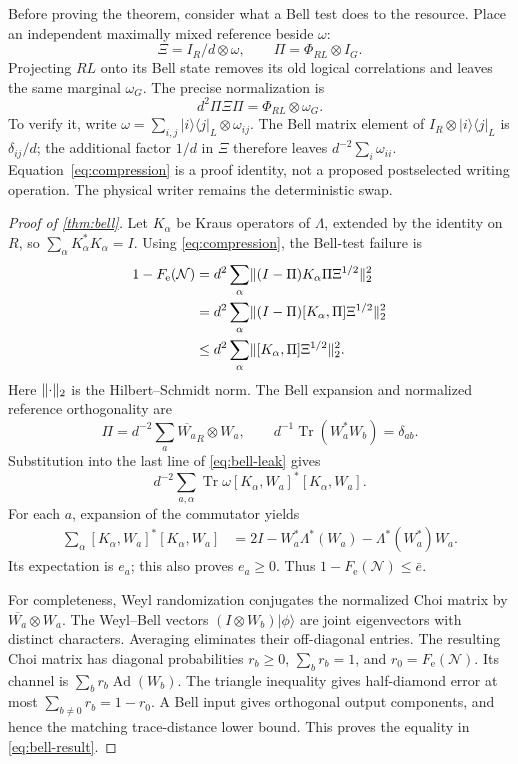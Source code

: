 \documentclass[11pt,reqno]{amsart}
\numberwithin{equation}{section}
\theoremstyle{definition}
\theoremstyle{remark}
\newcommand{\Tr}{\operatorname{Tr}}
\newcommand{\Ad}{\operatorname{Ad}}
\newcommand{\Ncal}{\mathcal N}
\newcommand{\Fe}{F_{\mathrm e}}
\DeclarePairedDelimiter{\norm}{\lVert}{\rVert}
\begin{document}
Before proving the theorem, consider what a Bell test does to the resource.
Place an independent maximally mixed reference beside \(\omega\):
\[
             \Xi=I_R/d\otimes\omega,\qquad
             \Pi=\Phi_{RL}\otimes I_G.
\]
Projecting \(RL\) onto its Bell state removes its old logical correlations
and leaves the same marginal \(\omega_G\). The precise normalization is
\begin{equation}\label{eq:compression}
                d^2\Pi\Xi\Pi=\Phi_{RL}\otimes\omega_G.
\end{equation}
To verify it, write
\(\omega=\sum_{i,j}|i\rangle\langle j|_L\otimes\omega_{ij}\).
The Bell matrix element of \(I_R\otimes|i\rangle\langle j|_L\)
is \(\delta_{ij}/d\); the additional factor \(1/d\) in \(\Xi\)
therefore leaves \(d^{-2}\sum_i\omega_{ii}\).
Equation~\eqref{eq:compression} is a proof identity, not a proposed
postselected writing operation. The physical writer remains the
deterministic swap.

\begin{proof}[Proof of \cref{thm:bell}]
Let \(K_\alpha\) be Kraus operators of \(\Lambda\), extended by the identity
on \(R\), so \(\sum_\alpha K_\alpha^*K_\alpha=I\).
Using \eqref{eq:compression}, the Bell-test failure is
\begin{align}
 1-\Fe(\Ncal)
 &=d^2\sum_\alpha
       \norm{(I-\Pi)K_\alpha\Pi\Xi^{1/2}}_2^2 \notag\\
 &=d^2\sum_\alpha
       \norm{(I-\Pi)[K_\alpha,\Pi]\Xi^{1/2}}_2^2 \notag\\
 &\le d^2\sum_\alpha\norm{[K_\alpha,\Pi]\Xi^{1/2}}_2^2 .
                                                        \label{eq:bell-leak}
\end{align}
Here \(\norm{\cdot}_2\) is the Hilbert--Schmidt norm.
The Bell expansion and normalized reference orthogonality are
\[
 \Pi=d^{-2}\sum_a\overline{W_a}_R\otimes W_a,\qquad
 d^{-1}\Tr(W_a^*W_b)=\delta_{ab}.
\]
Substitution into the last line of \eqref{eq:bell-leak} gives
\[
 d^{-2}\sum_{a,\alpha}
       \Tr\omega[K_\alpha,W_a]^*[K_\alpha,W_a].
\]
For each \(a\), expansion of the commutator yields
\begin{align*}
 \sum_\alpha[K_\alpha,W_a]^*[K_\alpha,W_a]
   &=2I-W_a^*\Lambda^*(W_a)-\Lambda^*(W_a^*)W_a .
\end{align*}
Its expectation is \(e_a\); this also proves \(e_a\ge0\).
Thus \(1-\Fe(\Ncal)\le\bar e\).

For completeness, Weyl randomization conjugates the normalized Choi
matrix by \(\overline{W_a}\otimes W_a\). The Weyl--Bell vectors
\((I\otimes W_b)|\phi\rangle\) are joint eigenvectors with distinct
characters. Averaging eliminates their off-diagonal entries.
The resulting Choi matrix has diagonal probabilities \(r_b\ge0\),
\(\sum_b r_b=1\), and \(r_0=\Fe(\Ncal)\). Its channel is
\(\sum_b r_b\Ad(W_b)\).
The triangle inequality gives half-diamond error at most
\(\sum_{b\ne0}r_b=1-r_0\). A Bell input gives orthogonal output
components, and hence the matching trace-distance lower bound.
This proves the equality in \eqref{eq:bell-result}.
\end{proof}
\end{document}

